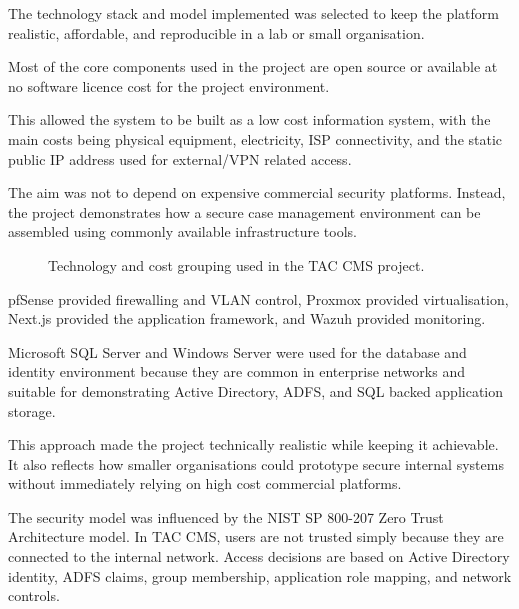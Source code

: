 The technology stack and model implemented was selected to keep the platform realistic, affordable, and reproducible in a lab or small organisation.

Most of the core components used in the project are open source or available at no software licence cost for the project environment. 

This allowed the system to be built as a low cost information system, with the main costs being physical equipment, electricity, ISP connectivity, and the static public IP address used for external/VPN related access.

The aim was not to depend on expensive commercial security platforms. Instead, the project demonstrates how a secure case management environment can be assembled using commonly available infrastructure tools.

\begin{figure}[H]
    \centering
    \caption{Technology and cost grouping used in the TAC CMS project.}
    \label{fig:technology-cost-grouping}
\end{figure}

pfSense provided firewalling and VLAN control, Proxmox provided virtualisation, Next.js provided the application framework, and Wazuh provided monitoring. 

Microsoft SQL Server and Windows Server were used for the database and identity environment because they are common in enterprise networks and suitable for demonstrating Active Directory, ADFS, and SQL backed application storage.


This approach made the project technically realistic while keeping it achievable. It also reflects how smaller organisations could prototype secure internal systems without immediately relying on high cost commercial platforms.








The security model was influenced by the NIST SP 800-207 Zero Trust Architecture model. In TAC CMS, users are not trusted simply because they are connected to the internal network. Access decisions are based on Active Directory identity, ADFS claims, group membership, application role mapping, and network controls.

